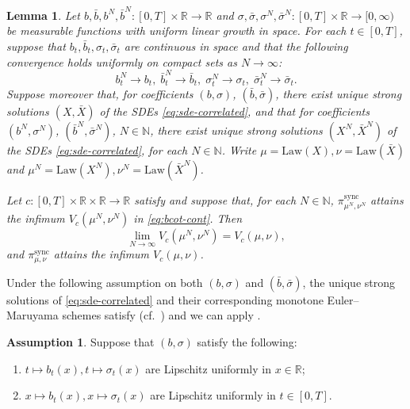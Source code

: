 \documentclass[onseside, final]{amsart}
\newtheorem{lemma}[theorem]{Lemma}
\theoremstyle{definition}
\newtheorem{assumption}[theorem]{Assumption}
\newcommand{\N}{\mathbb N}
\newcommand{\R}{\mathbb R}
\newcommand{\Law}{\mathrm{Law}}
\newcommand{\sync}{\mathrm{sync}}
\numberwithin{equation}{section}
\begin{document}
	\begin{lemma}\label{lem:stability}
		Let $b, \bar b, b^N, \bar b^N \colon [0, T] \times \R \to \R$ and $\sigma, \bar \sigma, \sigma^N, \bar \sigma^N \colon [0, T] \times \R \to [0, \infty)$ be measurable functions with uniform linear growth in space. For each $t \in [0, T]$, suppose that  $b_t, \bar b_t, \sigma_t, \bar \sigma_t$ are continuous in space and that the following convergence holds uniformly on compact sets as $N \to \infty$:
		\begin{equation}
			b^N_t \to b_t, \; \bar b^N_t \to \bar b_t, \; \sigma^N_t \to \sigma_t, \; \bar \sigma^N_t \to \bar \sigma_t.
		\end{equation}
		Suppose moreover that, for coefficients $(b, \sigma)$, $(\bar b, \bar \sigma)$, there exist unique strong solutions $(X, \bar X)$ of the SDEs \eqref{eq:sde-correlated}, and that for coefficients $(b^N, \sigma^N)$, $(\bar b^N, \bar \sigma^N)$, $N \in \N$, there exist unique strong solutions $(X^N, \bar X^N)$ of the SDEs \eqref{eq:sde-correlated}, for each $N \in \N$. Write $\mu = \Law(X), \nu = \Law(\bar X)$ and $\mu^N = \Law(X^N), \nu^N = \Law(\bar X^N)$.
		
		Let $c \colon [0, T] \times \R \times \R \to \R$ satisfy  and suppose that, for each $N \in \N$, $\pi^\sync_{\mu^N, \nu^N}$ attains the infimum $V_c(\mu^N, \nu^N)$ in \eqref{eq:bcot-cont}.
		Then
		\begin{equation}
			\lim_{N \to \infty} V_c(\mu^N, \nu^N) = V_c(\mu, \nu),
		\end{equation}
		and $\pi^\sync_{\mu, \nu}$ attains the infimum $V_c(\mu, \nu)$.
	\end{lemma}
	
	Under the following assumption on both $(b, \sigma)$ and $(\bar b, \bar \sigma)$, the unique strong solutions of \eqref{eq:sde-correlated} and their corresponding monotone Euler--Maruyama schemes satisfy  (cf.~) and we can apply .
	
	\begin{assumption}\label{ass:lipschitz}
		Suppose that $(b, \sigma)$ satisfy the following:
		\begin{enumerate}[label = (\roman*)]
			\item $t \mapsto b_t(x), t \mapsto \sigma_t(x)$ are Lipschitz uniformly in $x \in \R$;
			\item $x \mapsto b_t(x), x \mapsto \sigma_t(x)$ are Lipschitz uniformly in $t \in [0, T]$.
		\end{enumerate}
	\end{assumption}
	
\end{document}
